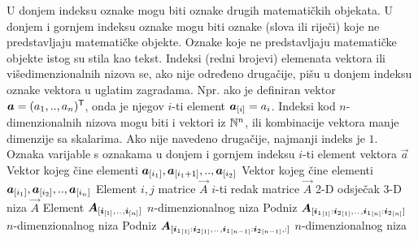 {U donjem indeksu oznake mogu biti oznake drugih matematičkih objekata. U donjem i gornjem indeksu oznake mogu biti oznake (slova ili riječi) koje ne predstavljaju matematičke objekte. Oznake koje ne predstavljaju matematičke objekte istog su stila kao tekst. Indeksi (redni brojevi) elemenata vektora ili višedimenzionalnih nizova se, ako nije određeno drugačije, pišu u donjem indeksu oznake vektora u uglatim zagradama. Npr. ako je definiran vektor $\vec a=(a_1,.., a_n)^\tp$, onda je njegov $i$-ti element $\vec a_\ind{i}=a_i$. Indeksi kod $n$-dimenzionalnih nizova mogu biti i vektori iz $\mathbb{N}^{n}$, ili kombinacije vektora manje dimenzije sa skalarima. Ako nije navedeno drugačije, najmanji indeks je $1$.}
	{Oznaka varijable s oznakama u donjem i gornjem indeksu}
	{$i$-ti element vektora $\vec{a}$}
	{Vektor kojeg čine elementi $\vec{a}_\ind{i_1}, \vec{a}_\ind{i_1+1},.., \vec{a}_{\sbr{i_2}}$}
	{Vektor kojeg čine elementi $\vec{a}_\ind{i_1}, \vec{a}_\ind{i_2},.., \vec{a}_{\sbr{i_n}}$}
	{Element $i,j$ matrice $\vec A$}
	{$i$-ti redak matrice $\vec A$}
	{2-D odsječak 3-D niza $\vec A$}
	{Element $\vec{A}_\ind{\vec i_\ind{1},\bidot,\vec i_\ind{n}}$ $n$-dimenzionalnog niza}
	{Podniz $\vec{A}_\ind{{\vec i_1}_\ind{1}:{\vec i_2}_\ind{1},\bidot,{\vec i_1}_\ind{n}:{\vec i_2}_\ind{n}}$ $n$-dimenzionalnog niza}
	{Podniz $\vec{A}_\ind{{\vec i_1}_\ind{1}:{\vec i_2}_\ind{1},\bidot,{\vec i_1}_\ind{n-1}:{\vec i_2}_\ind{n-1},:}$ $n$-dimenzionalnog niza}

